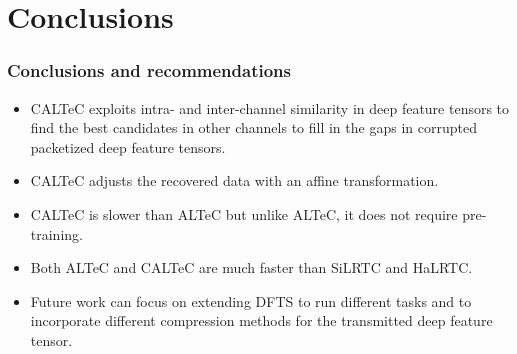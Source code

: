 \documentclass[aspectratio=169]{beamer}
\begin{document}
\section{Conclusions}
\begin{frame}
	\frametitle{Conclusions and recommendations}
	\begin{itemize}
		\item CALTeC exploits intra- and inter-channel similarity in deep feature tensors to find the best candidates in other channels to fill in the gaps in corrupted packetized deep feature tensors.
		\item CALTeC adjusts the recovered data with an affine transformation.
		\item CALTeC is slower than ALTeC but unlike ALTeC, it does not require pre-training.
		\item Both ALTeC and CALTeC are much faster than SiLRTC and HaLRTC.
		\item Future work can focus on extending DFTS to run different tasks and to incorporate different compression methods for the transmitted deep feature tensor.
	\end{itemize}
\end{frame}

\end{document}
